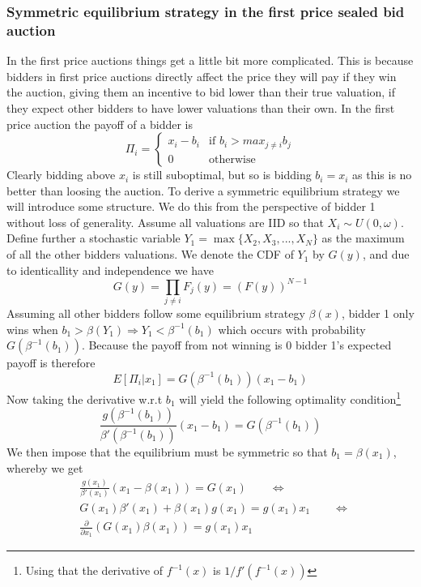 \subsubsection{Symmetric equilibrium strategy in the first price sealed bid auction}
In the first price auctions things get a little bit more complicated. This is because bidders in first price auctions directly affect the price they will pay if they win the auction, giving them an incentive to bid lower than their true valuation, if they expect other bidders to have lower valuations than their own. In the first price auction the payoff of a bidder is
\begin{equation}
  \Pi_i = \begin{cases}
  x_i - b_i & \textrm{if } b_i > max_{j \neq i} b_j \\
  0 & \textrm{otherwise}
\end{cases}
\end{equation}
Clearly bidding above $x_i$ is still suboptimal, but so is bidding $b_i=x_i$ as this is no better than loosing the auction. To derive a symmetric equilibrium strategy we will introduce some structure. We do this from the perspective of bidder 1 without loss of generality. Assume all valuations are IID so that $X_i \sim U(0,\omega)$. Define further a stochastic variable $Y_1=\max\{X_2,X_3,...,X_{N}\}$ as the maximum of all the other bidders valuations. We denote the CDF of $Y_1$ by $G(y)$, and due to identicallity and independence we have
\begin{equation}
  G(y) = \prod_{j \neq i} F_j(y) = (F(y))^{N-1}
\end{equation}
Assuming all other bidders follow some equilibrium strategy $\beta(x)$, bidder 1 only wins when $b_1 > \beta(Y_1) \Rightarrow Y_1 < \beta^{-1}(b_1)$ which occurs with probability $G(\beta^{-1}(b_1))$. Because the payoff from not winning is 0 bidder 1's expected payoff is therefore
\begin{equation}
  E[\Pi_i|x_1] = G(\beta^{-1}(b_1))(x_1 - b_1)
\end{equation}
Now taking the derivative w.r.t $b_1$ will yield the following optimality condition\footnote{Using that the derivative of $f^{-1}(x)$ is $1/f'(f^{-1}(x))$}
\begin{equation}
  \frac{g(\beta^{-1}(b_1))}{\beta'(\beta^{-1}(b_1))}(x_1 - b_1) = G(\beta^{-1}(b_1))
\end{equation}
We then impose that the equilibrium must be symmetric so that $b_1 = \beta(x_1)$, whereby we get
\begin{equation}
  \begin{split}
  &\frac{g(x_1)}{\beta'(x_1)}(x_1-\beta(x_1)) = G(x_1) \qquad   \Leftrightarrow \\
  &G(x_1) \beta'(x_1) + \beta(x_1)g(x_1) = g(x_1)x_1   \qquad \Leftrightarrow \\
  & \frac{\partial}{\partial x_1}(G(x_1) \beta(x_1)) = g(x_1) x_1
\end{split}
\end{equation}
